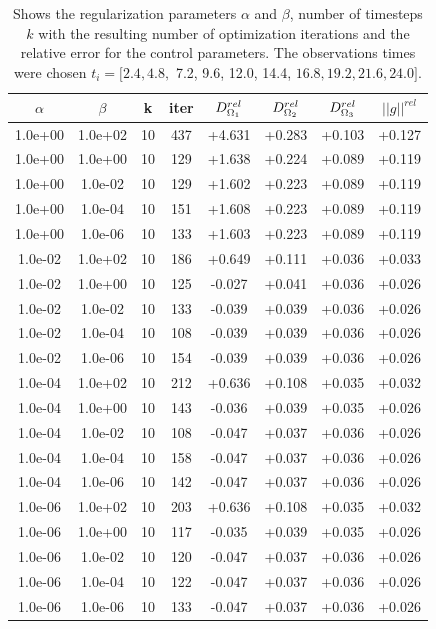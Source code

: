 \documentclass[11pt,a4paper]{article}
\begin{document}
\begin{table}
\centering
\caption{Shows the regularization parameters $\alpha$ and $\beta$, number of timesteps $k$ with the resulting number of optimization iterations and the relative error for the control parameters. The observations times were chosen $ t_i=[2.4, 4.8,$ 7.2, 9.6, 12.0, 14.4, $16.8, 19.2, 21.6, 24.0]$.}
\begin{tabular}{*{8}c}
$\alpha$ & $\beta$ & k  & iter & $ D_{\Omega_1}\sp{rel}$ & $ D_{\Omega_2}\sp{rel} $ & $D_{\Omega_3}\sp{rel}$ & $||g||^{rel}$ \\
\hline 
 1.0e+00 	 & 1.0e+02 	 & 10 & 437 	 & +4.631 & +0.283 & +0.103 & +0.127 \\ 
 1.0e+00 	 & 1.0e+00 	 & 10 & 129 	 & +1.638 & +0.224 & +0.089 & +0.119 \\ 
 1.0e+00 	 & 1.0e-02 	 & 10 & 129 	 & +1.602 & +0.223 & +0.089 & +0.119 \\ 
 1.0e+00 	 & 1.0e-04 	 & 10 & 151 	 & +1.608 & +0.223 & +0.089 & +0.119 \\ 
 1.0e+00 	 & 1.0e-06 	 & 10 & 133 	 & +1.603 & +0.223 & +0.089 & +0.119 \\ 

 1.0e-02 	 & 1.0e+02 	 & 10 & 186 	 & +0.649 & +0.111 & +0.036 & +0.033 \\ 
 1.0e-02 	 & 1.0e+00 	 & 10 & 125 	 & -0.027 & +0.041 & +0.036 & +0.026 \\ 
 1.0e-02 	 & 1.0e-02 	 & 10 & 133 	 & -0.039 & +0.039 & +0.036 & +0.026 \\ 
 1.0e-02 	 & 1.0e-04 	 & 10 & 108 	 & -0.039 & +0.039 & +0.036 & +0.026 \\ 
 1.0e-02 	 & 1.0e-06 	 & 10 & 154 	 & -0.039 & +0.039 & +0.036 & +0.026 \\ 

 1.0e-04 	 & 1.0e+02 	 & 10 & 212 	 & +0.636 & +0.108 & +0.035 & +0.032 \\ 
 1.0e-04 	 & 1.0e+00 	 & 10 & 143 	 & -0.036 & +0.039 & +0.035 & +0.026 \\ 
 1.0e-04 	 & 1.0e-02 	 & 10 & 108 	 & -0.047 & +0.037 & +0.036 & +0.026 \\ 
 1.0e-04 	 & 1.0e-04 	 & 10 & 158 	 & -0.047 & +0.037 & +0.036 & +0.026 \\ 
 1.0e-04 	 & 1.0e-06 	 & 10 & 142 	 & -0.047 & +0.037 & +0.036 & +0.026 \\ 

 1.0e-06 	 & 1.0e+02 	 & 10 & 203 	 & +0.636 & +0.108 & +0.035 & +0.032 \\ 
 1.0e-06 	 & 1.0e+00 	 & 10 & 117 	 & -0.035 & +0.039 & +0.035 & +0.026 \\ 
 1.0e-06 	 & 1.0e-02 	 & 10 & 120 	 & -0.047 & +0.037 & +0.036 & +0.026 \\ 
 1.0e-06 	 & 1.0e-04 	 & 10 & 122 	 & -0.047 & +0.037 & +0.036 & +0.026 \\ 
 1.0e-06 	 & 1.0e-06 	 & 10 & 133 	 & -0.047 & +0.037 & +0.036 & +0.026 \\ 

\end{tabular}
\label{Tab::1}
\end{table} 
 
\end{document}
